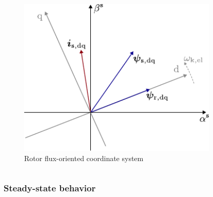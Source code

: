 \begin{frame}
\begin{columns}
\begin{column}{0.45\textwidth}
\begin{figure}
                \includegraphics[width=0.85\textwidth]{fig/lec06/K_coordinates_rotor_flux_orientation.pdf}
                \caption{Rotor flux-oriented coordinate system}
                \label{fig:K_coordinates_rotor_flux_orientation}
            \end{figure}
        \end{column}
    \end{columns}
\end{frame}

\begin{frame}
	\frametitle{Steady-state behavior}
    
\end{frame}